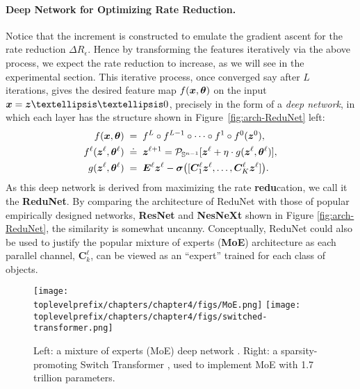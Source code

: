 \documentclass[../../book-main.tex]{subfiles}
\begin{document}
\paragraph{Deep Network for Optimizing Rate Reduction.} Notice that the increment is constructed to emulate the gradient ascent for the rate reduction $\Delta R_\epsilon$. Hence by transforming the features iteratively via the above process, we expect the rate reduction to increase, as we will see in the experimental section. This iterative process, once converged say after $L$ iterations, gives the desired feature map $f(\bm{x}, \bm \theta)$ on the input $\x = \z……0 $, precisely in the form of a {\em deep network}, in which each layer has the structure shown in Figure~\ref{fig:arch-ReduNet} left:
\begin{equation}\label{eqn:ReduNet}
\begin{aligned}
f(\bm{x}, \bm \theta)\; =&  \;\;f^L \circ f^{L-1} \circ  \cdots \circ f^1 \circ
    f^0(\bm{z}^0),  \\ 
f^\ell(\bm{z}^\ell, \bm \theta^\ell) \; \doteq & \;\; \bm{z}^{\ell+1} = \mathcal{P}_{\mathbb{S}^{n-1}}[\bm{z}^{\ell} + \eta\cdot g(\bm{z}^{\ell}, \bm \theta^{\ell})], \\
g(\bm{z}^{\ell}, \bm \theta^{\ell}) \; =&\;\; \bm E^{\ell} \bm{z}^{\ell} -  \bm \sigma\big([\bm{C}^{\ell}_{1} \bm{z}^{\ell}, \dots, \bm{C}^{\ell}_{K} \bm{z}^{\ell}]\big).
\end{aligned}
\end{equation}
As this deep network is derived from maximizing the rate \textbf{redu}cation, we call it the \textbf{ReduNet}. By comparing the architecture of ReduNet with those of popular empirically designed networks, \textbf{ResNet} and \textbf{NesNeXt} shown in Figure \ref{fig:arch-ReduNet}, the similarity is somewhat uncanny. Conceptually, ReduNet could also be used to justify the popular mixture of experts (\textbf{MoE}) architecture \cite{MoE} as each parallel channel, $\bm{C}^{\ell}_k$, can be viewed as an ``expert'' trained for each class of objects.

\begin{figure}[t]
    \centering
    \texttt{[image: \\toplevelprefix/chapters/chapter4/figs/MoE.png]} \hspace{5mm}
    \texttt{[image: \\toplevelprefix/chapters/chapter4/figs/switched-transformer.png]}
    \caption{Left: a mixture of experts (MoE) deep network \cite{MoE}. Right: a sparsity-promoting Switch Transformer \cite{Fedus-2022}, used to implement MoE with 1.7 trillion parameters.}
    \label{fig:enter-label}
\end{figure}
\end{document}
